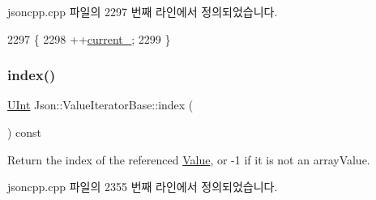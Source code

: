 jsoncpp.\+cpp 파일의 2297 번째 라인에서 정의되었습니다.


\begin{DoxyCode}
2297                                   \{
2298   ++\hyperlink{class_json_1_1_value_iterator_base_ab3138ce8af8301cca3b041ea55cb922a}{current\_};
2299 \}
\end{DoxyCode}
\mbox{\label{class_json_1_1_value_iterator_base_a549c66a0bd20e9ae772175a5c0d2e88a}} 
\subsubsection{\texorpdfstring{index()}{index()}}
{\footnotesize\ttfamily \hyperlink{namespace_json_a800fb90eb6ee8d5d62b600c06f87f7d4}{U\+Int} Json\+::\+Value\+Iterator\+Base\+::index (\begin{DoxyParamCaption}{ }\end{DoxyParamCaption}) const}



Return the index of the referenced \hyperlink{class_json_1_1_value}{Value}, or -\/1 if it is not an array\+Value. 



jsoncpp.\+cpp 파일의 2355 번째 라인에서 정의되었습니다.


